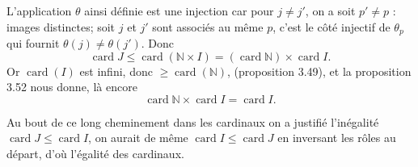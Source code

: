 L'application $\theta$ ainsi définie est une injection car pour $j\ne j'$, on a soit $p'\ne p$ : images distinctes; soit $j$ et $j'$ sont associés au même $p$, c'est le côté injectif de $\theta_p$ qui fournit $\theta(j)\ne\theta(j')$. Donc
\[
\operatorname{card}J\le\operatorname{card}(\mathbb N\times I)=(\operatorname{card}\mathbb N)\times\operatorname{card}I.
\]
Or $\operatorname{card}(I)$ est infini, donc $\ge\operatorname{card}(\mathbb N)$, (proposition 3.49), et la proposition 3.52 nous donne, là encore
\[
\operatorname{card}\mathbb N\times\operatorname{card}I=\operatorname{card}I.
\]

Au bout de ce long cheminement dans les cardinaux on a justifié l'inégalité $\operatorname{card}J\le\operatorname{card}I$, on aurait de même $\operatorname{card}I\le\operatorname{card}J$ en inversant les rôles au départ, d'où l'égalité des cardinaux. \bookend
